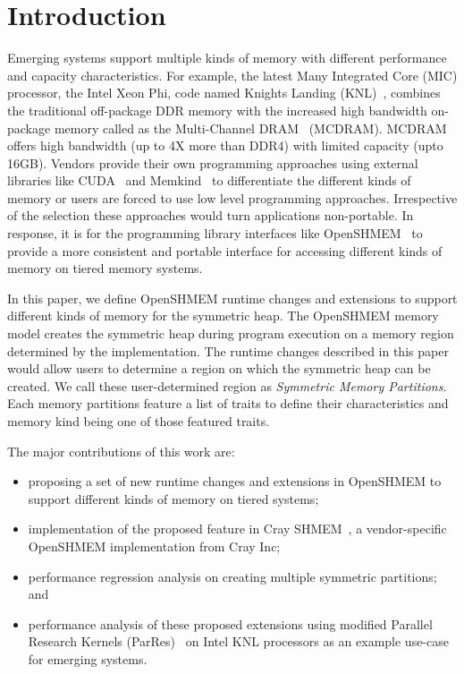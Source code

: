 \section{Introduction}
\label{src:intro}

Emerging systems support multiple kinds of memory with different
performance and capacity characteristics. For example, the latest
Many Integrated Core (MIC) processor, the Intel Xeon Phi,
code named Knights Landing (KNL)~\cite{KNL}, combines the traditional
off-package DDR memory with the increased high bandwidth on-package
memory called as the Multi-Channel DRAM~\cite{MCDRAM} (MCDRAM). MCDRAM
offers high bandwidth (up to 4X more than DDR4) with limited
capacity (upto 16GB). Vendors provide their own programming approaches
using external libraries like CUDA~\cite{cuda} and Memkind~\cite{memkind}
to differentiate the different kinds of memory or users are forced to
use low level programming approaches. Irrespective of the selection these
approaches would turn applications non-portable. In response, it is for
the programming library interfaces like OpenSHMEM~\cite{osm} to provide
a more consistent and portable interface for accessing different kinds
of memory on tiered memory systems.

In this paper, we define OpenSHMEM runtime changes and extensions to
support different kinds of memory for the symmetric heap. The OpenSHMEM
memory model creates the symmetric heap during program execution on a
memory region determined by the implementation. The runtime changes
described in this paper would allow users to determine a region on
which the symmetric heap can be created. We call these user-determined
region as \emph{Symmetric Memory Partitions}. Each memory partitions
feature a list of traits to define their characteristics and memory
kind being one of those featured traits.

The major contributions of this work are:
\begin{itemize}
    \item proposing a set of new runtime changes and extensions in
    OpenSHMEM to support different kinds of memory on tiered systems;
    \item implementation of the proposed feature in
    Cray SHMEM~\cite{csma}, a vendor-specific OpenSHMEM implementation
    from Cray Inc;
    \item performance regression analysis on creating multiple symmetric
    partitions; and
    \item performance analysis of these proposed extensions using
    modified Parallel Research Kernels (ParRes)~\cite{parres} on Intel
    KNL processors as an example use-case for emerging systems.
\end{itemize}

